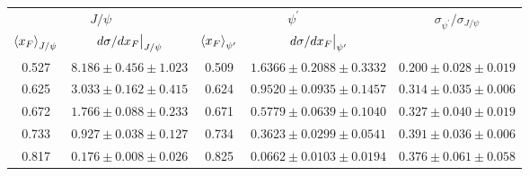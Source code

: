 \begin{tabular}{cc|cc|c}
\hline
\multicolumn{2}{c|}{$J/\psi$} &
  \multicolumn{2}{c|}{$\psi^{\prime}$} &
  \multirow{2}{*}{$\sigma_{\psi^\prime}/\sigma_{J/\psi}$} \\ \cline{1-4}
$\expval{x_F}_{J/\psi}$ &
  $\eval{d\sigma/dx_F}_{J/\psi}$ &
  $\expval{x_F}_{\psi^\prime}$ &
  $\eval{d\sigma/dx_F}_{\psi^\prime}$ &
   \\ \hline
\multicolumn{1}{c|}{0.527} &
  $8.186\pm0.456\pm1.023$ &
  \multicolumn{1}{c|}{0.509} &
  $1.6366\pm0.2088\pm0.3332$ &
  $0.200\pm0.028\pm0.019$ \\
\multicolumn{1}{c|}{0.625} &
  $3.033\pm0.162\pm0.415$ &
  \multicolumn{1}{c|}{0.624} &
  $0.9520\pm0.0935\pm0.1457$ &
  $0.314\pm0.035\pm0.006$ \\
\multicolumn{1}{c|}{0.672} &
  $1.766\pm0.088\pm0.233$ &
  \multicolumn{1}{c|}{0.671} &
  $0.5779\pm0.0639\pm0.1040$ &
  $0.327\pm0.040\pm0.019$ \\
\multicolumn{1}{c|}{0.733} &
  $0.927\pm0.038\pm0.127$ &
  \multicolumn{1}{c|}{0.734} &
  $0.3623\pm0.0299\pm0.0541$ &
  $0.391\pm0.036\pm0.006$ \\
\multicolumn{1}{c|}{0.817} &
  $0.176\pm0.008\pm0.026$ &
  \multicolumn{1}{c|}{0.825} &
  $0.0662\pm0.0103\pm0.0194$ &
  $0.376\pm0.061\pm0.058$ \\ \hline
\end{tabular}
